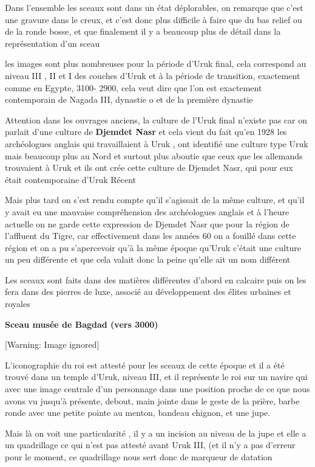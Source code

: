 \documentclass[a4paper,10pt]{article}
\begin{document}
Dans l'ensemble les sceaux sont dans un état
déplorables, on remarque que c'est une gravure dans le
creux, et c'est donc plus difficile à faire que du bas
relief ou de la ronde bosse, et que finalement il y a beaucoup plus de
détail dans la représentation d'un sceau

les images sont plus nombreuses pour la période d'Uruk
final, cela correspond au niveau III , II et I des couches
d'Uruk et à la période de transition, exactement comme
en Egypte, 3100- 2900, cela veut dire que l'on est
exactement contemporain de Nagada III, dynastie o et de la première
dynastie

Attention dans les ouvrages anciens, la culture de
l'Uruk final n'existe pas car on
parlait d'une culture de \textbf{Djemdet Nasr} et cela
vient du fait qu'en 1928 les archéologues anglais qui
travaillaient à Uruk , ont identifié une culture type Uruk mais
beaucoup plus au Nord et surtout plus aboutie que ceux que les
allemands trouvaient à Uruk et ils ont crée cette culture de Djemdet
Nasr, qui pour eux était contemporaine d'Uruk Récent

Mais plus tard on s'est rendu compte
qu'il s'agissait de la même culture,
et qu'il y avait eu une mauvaise compréhension des
archéologues anglais et à l'heure actuelle on ne garde
cette expression de Djemdet Nasr que pour la région de
l'affluent du Tigre, car effectivement dans les années
60  on a fouillé dans cette région et on a pu
s'apercevoir qu'à la même époque
qu'Uruk c'était une culture un peu
différente et que cela valait donc la peine qu'elle
ait un nom différent

Les sceaux sont faits dans des matières différentes
d'abord en calcaire puis on les fera dans des pierres
de luxe, associé  au développement des élites urbaines et royales

\textbf{Sceau musée de Bagdad  (vers 3000)}

  [Warning: Image ignored] %
 

L'iconographie du roi est attesté pour les sceaux de
cette époque  et il a été trouvé dans un temple
d'Uruk, niveau III, et il représente le roi sur un
navire qui avec une image centrale d'un personnage
dans une position proche de ce que nous avons vu
jusqu'à présente, debout, main jointe dans le geste de
la prière, barbe ronde avec une petite pointe au menton,  bandeau
chignon, et une jupe.

Mais là on voit une particularité , il y a un incision au niveau de la
jupe et elle a un quadrillage ce qui n'est pas attesté
avant Uruk III, (et il n'y a pas
d'erreur pour le moment, ce quadrillage nous sert donc
de marqueur de datation
\end{document}
